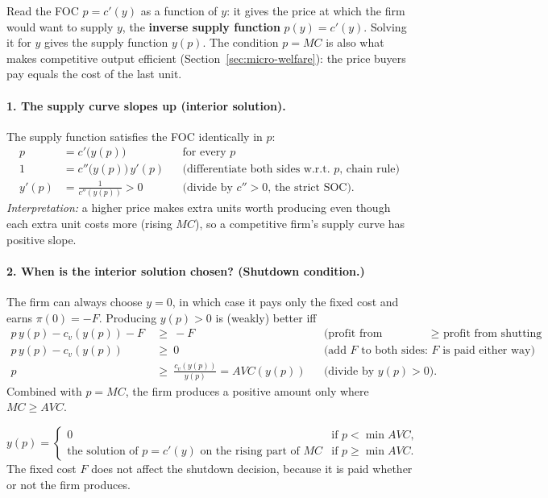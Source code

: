 Read the FOC $p=c'(y)$ as a function of $y$: it gives the price at which the firm would want to supply $y$, the \textbf{inverse supply function} $p(y)=c'(y)$. Solving it for $y$ gives the supply function $y(p)$. The condition $p=MC$ is also what makes competitive output efficient (Section~\ref{sec:micro-welfare}): the price buyers pay equals the cost of the last unit.

\paragraph{1. The supply curve slopes up (interior solution).} The supply function satisfies the FOC identically in $p$:
\begin{align*}
p&=c'\big(y(p)\big) &&\text{for every } p\\
1&=c''\big(y(p)\big)\,y'(p) &&\text{(differentiate both sides w.r.t.\ $p$, chain rule)}\\
y'(p)&=\frac{1}{c''(y(p))}>0 &&\text{(divide by $c''>0$, the strict SOC).}
\end{align*}
\emph{Interpretation:} a higher price makes extra units worth producing even though each extra unit costs more (rising $MC$), so a competitive firm's supply curve has positive slope.

\paragraph{2. When is the interior solution chosen? (Shutdown condition.)} The firm can always choose $y=0$, in which case it pays only the fixed cost and earns $\pi(0)=-F$. Producing $y(p)>0$ is (weakly) better iff
\begin{align*}
p\,y(p)-c_v(y(p))-F&\ \ge\ -F &&\text{(profit from producing $\ge$ profit from shutting down)}\\
p\,y(p)-c_v(y(p))&\ \ge\ 0 &&\text{(add $F$ to both sides: $F$ is paid either way)}\\
p&\ \ge\ \frac{c_v(y(p))}{y(p)}=AVC(y(p)) &&\text{(divide by $y(p)>0$).}
\end{align*}
Combined with $p=MC$, the firm produces a positive amount only where $MC\ge AVC$.

\begin{keybox}[title=Short-run supply of a competitive firm]
\[
y(p)=\begin{cases}0 & \text{if } p<\min AVC,\\ \text{the solution of } p=c'(y) \text{ on the rising part of } MC & \text{if } p\ge \min AVC.\end{cases}
\]
The fixed cost $F$ does not affect the shutdown decision, because it is paid whether or not the firm produces.
\end{keybox}

